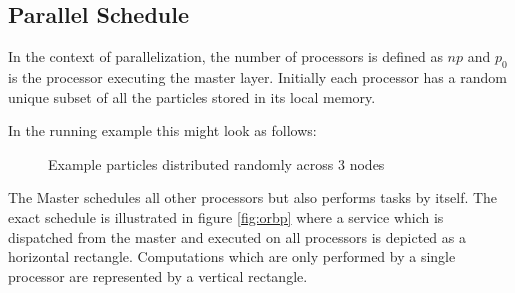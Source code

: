\documentclass[]{article}
\begin{document}
\subsection{Parallel Schedule}\label{sec:parellize-orb}

In the context of parallelization, the number of processors is defined as $np$ and $p_0$ is the processor executing the master layer. 
Initially each processor has a random unique subset of all the particles stored in its local memory.

In the running example this might look as follows:

\begin{figure}[H]
	
	\centering
	\caption{Example particles distributed randomly across 3 nodes}
\end{figure}

The Master schedules all other processors but also performs tasks by itself. The exact schedule is illustrated in figure \ref{fig:orbp} where a service which is dispatched from the master and executed on all processors is depicted as a horizontal rectangle. Computations which are only performed by a single processor are represented by a vertical rectangle. 
\end{document}
